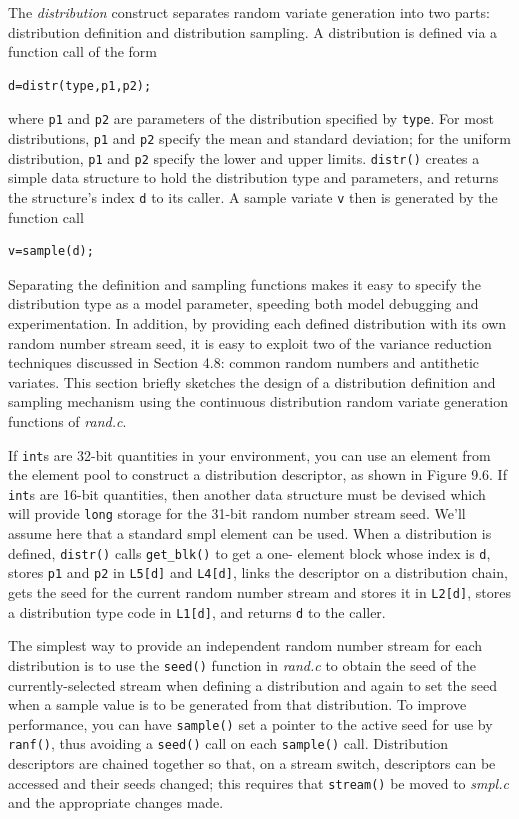 The \emph{distribution} construct separates random variate generation into two
parts: distribution definition and distribution sampling. A distribution is
defined via a function call of the form
\begin{verbatim}
d=distr(type,p1,p2);
\end{verbatim}
where \texttt{p1} and \texttt{p2} are parameters of the distribution specified by \texttt{type}. For
most distributions, \texttt{p1} and \texttt{p2} specify the mean and standard deviation; for
the uniform distribution, \texttt{p1} and \texttt{p2} specify the lower and upper limits.
\texttt{distr()} creates a simple data structure to hold the distribution type and
parameters, and returns the structure's index \texttt{d} to its caller. A sample
variate \texttt{v} then is generated by the function call
\begin{verbatim}
v=sample(d);
\end{verbatim}

Separating the definition and sampling functions makes it easy to
specify the distribution type as a model parameter, speeding both model
debugging and experimentation. In addition, by providing each defined
distribution with its own random number stream seed, it is easy to exploit
two of the variance reduction techniques discussed in Section 4.8: common
random numbers and antithetic variates. This section briefly sketches the
design of a distribution definition and sampling mechanism using the
continuous distribution random variate generation functions of \emph{rand.c}.

If \texttt{int}s are 32-bit quantities in your environment, you can use an element
from the element pool to construct a distribution descriptor, as shown in
Figure 9.6. If \texttt{int}s are 16-bit quantities, then another data structure must be
devised which will provide \texttt{long} storage for the 31-bit random number
stream seed. We'll assume here that a standard smpl element can be used.
When a distribution is defined, \texttt{distr()} calls \texttt{get\_blk()} to get a one-
element block whose index is \texttt{d}, stores \texttt{p1} and \texttt{p2} in \texttt{L5[d]} and \texttt{L4[d]}, links
the descriptor on a distribution chain, gets the seed for the current random
number stream and stores it in \texttt{L2[d]}, stores a distribution type code in
\texttt{L1[d]}, and returns \texttt{d} to the caller.

The simplest way to provide an independent random number stream for
each distribution is to use the \texttt{seed()} function in \emph{rand.c} to obtain the seed of
the currently-selected stream when defining a distribution and again to set
the seed when a sample value is to be generated from that distribution. To
improve performance, you can have \texttt{sample()} set a pointer to the active
seed for use by \texttt{ranf()}, thus avoiding a \texttt{seed()} call on each \texttt{sample()} call.
Distribution descriptors are chained together so that, on a stream switch,
descriptors can be accessed and their seeds changed; this requires that
\texttt{stream()} be moved to \emph{smpl.c} and the appropriate changes made.

